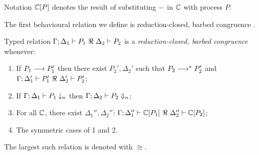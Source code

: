 \documentclass[a4paper,UKenglish]{lipics}
\theoremstyle{definition}
\begin{document}
Notation ${\Bbb C}[P]$ denotes the result of substituting 
$-$ in ${\Bbb C}$ with process $P$.


\noi The first behavioural relation we define is reduction-closed, barbed congruence \cite{HondaKYoshida95}. 

\begin{definition}\rm
\label{def:rc}
	Typed relation
	$\horel{\Gamma}{\Delta_1}{P_1}{\ \Re\ }{\Delta_2}{P_2}$
	is a {\em reduction-closed, barbed congruence} whenever:
	\begin{enumerate}[1)]
		\item	If $P_1 \longrightarrow P_1'$ then there exist $P_2', \Delta_2'$ such that $P_2 \longrightarrow^* P_2'$ and
			$\horel{\Gamma}{\Delta_1'}{P_1'}{\ \Re\ }{\Delta_2'}{P_2'}$;%

			\item	If $\Gamma;\Delta_1 \vdash P_1 \downarrow_{n}$ then $\Gamma;\Delta_2 \vdash P_2 \Downarrow_{n}$;%


		\item	For all ${\Bbb C}$, there exist $\Delta_1'',\Delta_2''$: $\horel{\Gamma}{\Delta_1''}{\context{\C}{P_1}}{\ \Re\ }{\Delta_2''}{\context{\C}{P_2}}$; 
		                      \item	The symmetric cases of 1 and 2.                
	\end{enumerate}
	The largest such relation is denoted with $\cong$.
\end{definition}
\end{document}
